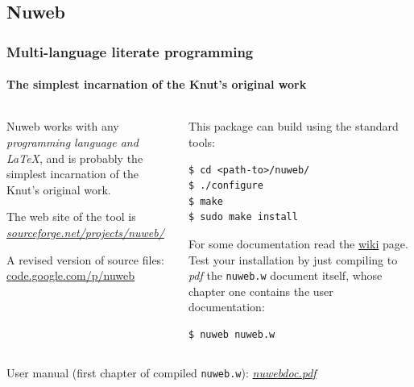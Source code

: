 \documentclass{beamer}
\begin{document}
\subsection{Nuweb}
\begin{frame}[fragile]

  \frametitle{Multi-language literate programming}
  \framesubtitle{The simplest incarnation of the Knut's original work}
  \footnotesize

\begin{columns}

	\begin{column}{6cm}
\alert{Nuweb} works with any \emph{programming language and \LaTeX}, and is probably the simplest incarnation of the Knut's original work.

The web site of the tool is \href{http://sourceforge.net/projects/nuweb/}{\emph{sourceforge.net/projects/nuweb/}}

A revised version of source files:\\ 
\href{https://code.google.com/p/nuweb/downloads/list}{\alert{code.google.com/p/nuweb}}	
	\end{column}
	
\pause	

	\begin{column}{6cm}
This package can build using the standard tools:
\begin{verbatim}
$ cd <path-to>/nuweb/
$ ./configure
$ make
$ sudo make install
\end{verbatim}
For some documentation read the \href{https://code.google.com/p/nuweb/source/browse/branches/qse-nuweb/README?r=3}{wiki} page.  Test your installation by just compiling to \emph{pdf} the \texttt{nuweb.w} document itself, whose chapter one contains the user documentation:
\begin{verbatim}
$ nuweb nuweb.w
\end{verbatim}	
	\end{column}
\end{columns}

\vfill
\alert{User manual} (first chapter of compiled \texttt{nuweb.w}): \href{run:nuwebdoc.pdf}{\emph{nuwebdoc.pdf}}

\end{frame}
\frame
\end{document}
